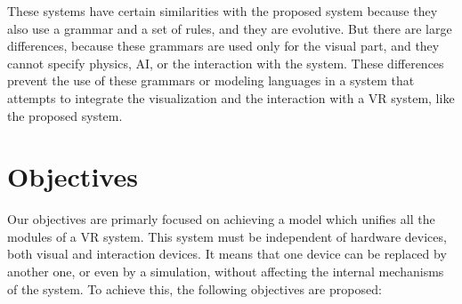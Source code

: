 These systems have certain similarities with the proposed system because they also use a grammar
and a set of rules, and they are evolutive. But there are large differences, because these grammars
are used only for the visual part, and they cannot specify physics, AI, or the interaction with the
system. These differences prevent the use of these grammars or modeling languages in a system that
attempts to integrate the visualization and the interaction with a VR system, like the proposed
system.




\section{Objectives
\label{sec:objectives}}

Our objectives are primarly focused on achieving a model which unifies all the modules of a VR
system. This system must be independent of hardware devices, both visual and interaction devices.
It means that one device can be replaced by another one, or even by a simulation, without affecting
the internal mechanisms of the system. To achieve this, the following objectives are proposed:


